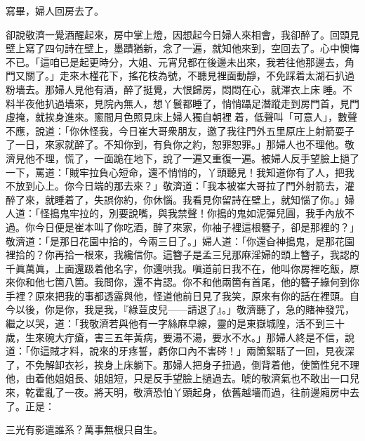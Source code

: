 寫畢，婦人回房去了。

卻說敬濟一覺酒醒起來，房中掌上燈，因想起今日婦人來相會，我卻醉了。回頭見壁上寫了四句詩在壁上，墨蹟猶新，念了一遍，就知他來到，空回去了。心中懊悔不已。「這咱已是起更時分，大姐、元宵兒都在後邊未出來，我若往他那邊去，角門又關了。」走來木槿花下，搖花枝為號，不聽見裡面動靜，不免踩着太湖石扒過粉墻去。那婦人見他有酒，醉了挺覺，大恨歸房，悶悶在心，就渾衣上床𢱉睡。不料半夜他扒過墻來，見院內無人，想丫鬟都睡了，悄悄躡足潛蹤走到房門首，見門虛掩，就挨身進來。窻間月色照見床上婦人獨自朝裡𢱉着，低聲叫「可意人」，數聲不應，說道：「你休怪我，今日崔大哥衆朋友，邀了我往門外五里原庄上射箭耍子了一日，來家就醉了。不知你到，有負你之約，恕罪恕罪。」那婦人也不理他。敬濟見他不理，慌了，一面跪在地下，說了一遍又重復一遍。{}被婦人反手望臉上撾了一下，罵道：「賊牢拉負心短命，還不悄悄的，丫頭聽見！我知道你有了人，把我不放到心上。你今日端的那去來？」敬濟道：「我本被崔大哥拉了門外射箭去，灌醉了來，就睡着了，失誤你約，你休惱。我看見你留詩在壁上，就知惱了你。」婦人道：「怪搗鬼牢拉的，別要說嘴，與我禁聲！你搗的鬼如泥彈兒圓，我手內放不過。你今日便是崔本叫了你吃酒，醉了來家，你袖子裡這根簪子，卻是那裡的？」敬濟道：「是那日花園中拾的，今兩三日了。」婦人道：「你還㒲神搗鬼，是那花園裡拾的？你再拾一根來，我纔信你。{}這簪子是孟三兒那麻淫婦的頭上簪子，{}我認的千眞萬眞，上面還趿着他名字，你還哄我。嗔道前日我不在，他叫你房裡吃飯，原來你和他七箇八箇。我問你，還不肯認。你不和他兩箇有首尾，他的簪子緣何到你手裡？原來把我的事都透露與他，怪道他前日見了我笑，{}原來有你的話在裡頭。自今以後，你是你，我是我，『綠荳皮兒——請退了』。」敬濟聽了，急的賭神發咒，繼之以哭，{}道：「我敬濟若與他有一字絲麻皁線，靈的是東嶽城隍，活不到三十歲，生來碗大疔瘡，害三五年黃病，要湯不湯，要水不水。」{}那婦人終是不信，說道：「你這賊才料，說來的牙疼誓，虧你口內不害硶！」兩箇絮聒了一回，見夜深了，不免解卸衣衫，挨身上床躺下。那婦人把身子扭過，倒背着他，使箇性兒不理他，由着他姐姐長、姐姐短，只是反手望臉上撾過去。{}唬的敬濟氣也不敢出一口兒來，乾霍亂了一夜。將天明，敬濟恐怕丫頭起身，依舊越墻而過，往前邊廂房中去了。正是：

\begin{myquote}
三光有影遣誰系？萬事無根只自生。
\end{myquote}

